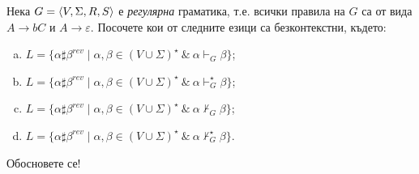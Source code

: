 
\begin{problem}
  Нека $G = \langle{V,\Sigma,R,S}\rangle$ е {\em регулярна} граматика, т.е.
  всички правила на $G$ са от вида $A \to bC$ и $A \to \varepsilon$.
  Посочете кои от следните езици са безконтекстни, където:
  \begin{enumerate}[a)]
  \item 
    $L = \{\alpha\sharp\beta^{rev} \mid \alpha,\beta \in (V \cup \Sigma)^\star\ \&\ \alpha \vdash_G \beta\}$;
  \item 
    $L = \{\alpha\sharp\beta^{rev} \mid \alpha,\beta \in (V \cup \Sigma)^\star\ \&\ \alpha \vdash^\star_G \beta\}$;
  \item
    $L = \{\alpha\sharp\beta^{rev} \mid \alpha,\beta \in (V \cup \Sigma)^\star\ \&\ \alpha \not\vdash_G \beta\}$;
  \item
    $L = \{\alpha\sharp\beta^{rev} \mid \alpha,\beta \in (V \cup \Sigma)^\star\ \&\ \alpha \not\vdash^\star_G \beta\}$.
  \end{enumerate}
  Обосновете се!
\end{problem}

